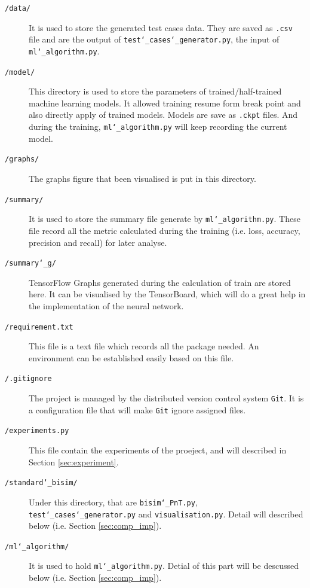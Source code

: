 \begin{description}
    \item[\texttt{/data/}] It is used to store the generated test cases data. They are saved as \texttt{.csv} file and are the output of \texttt{test\char`_cases\char`_generator.py}, the input of \texttt{ml\char`_algorithm.py}.
    
    \item[\texttt{/model/}] This directory is used to store the parameters of trained/half-trained machine learning models. It allowed training resume form break point and also directly apply of trained models.
    Models are save as \texttt{.ckpt} files.
    And during the training, \texttt{ml\char`_algorithm.py} will keep recording the current model.
    
    \item[\texttt{/graphs/}] The graphs figure that been visualised is put in this directory. 
    
    \item[\texttt{/summary/}] It is used to store the summary file generate by \texttt{ml\char`_algorithm.py}. These file record all the metric calculated during the training (i.e. loss, accuracy, precision and recall) for later analyse.
    
    \item[\texttt{/summary\char`_g/}] TensorFlow Graphs generated during the calculation of train are stored here. It can be visualised by the TensorBoard, which will do a great help in the implementation of the neural network.
    
    \item[\texttt{/requirement.txt}] This file is a text file which records all the package needed. An environment can be established easily based on this file.
    
    \item[\texttt{/.gitignore}] The project is managed by the distributed version control system \texttt{Git}. It is a configuration file that will make \texttt{Git} ignore assigned files.
    
    \item[\texttt{/experiments.py}] This file contain the experiments of the proeject, and will described in Section \ref{sec:experiment}.
    
    \item[\texttt{/standard\char`_bisim/}] Under this directory, that are \texttt{bisim\char`_PnT.py}, \texttt{test\char`_cases\char`_generator.py} and \texttt{visualisation.py}. Detail will described below (i.e. Section \ref{sec:comp_imp}). 
    
    \item[\texttt{/ml\char`_algorithm/}] It is used to hold \texttt{ml\char`_algorithm.py}. Detial of this part will be descussed below (i.e. Section \ref{sec:comp_imp}).
    
\end{description}


